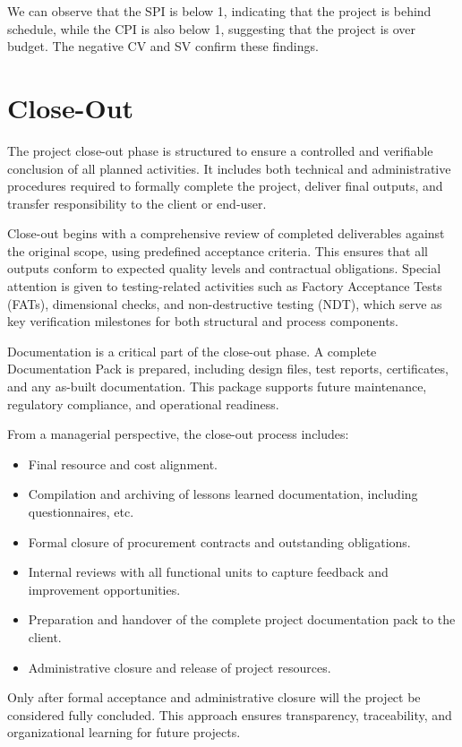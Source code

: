 We can observe that the SPI is below 1, indicating that the project is behind schedule, while the CPI is also below 1, suggesting that the project is over budget. The negative CV and SV confirm these findings.

\section{Close-Out}

The project close-out phase is structured to ensure a controlled and verifiable conclusion of all planned activities. It includes both technical and administrative procedures required to formally complete the project, deliver final outputs, and transfer responsibility to the client or end-user.

Close-out begins with a comprehensive review of completed deliverables against the original scope, using predefined acceptance criteria. This ensures that all outputs conform to expected quality levels and contractual obligations. Special attention is given to testing-related activities such as Factory Acceptance Tests (FATs), dimensional checks, and non-destructive testing (NDT), which serve as key verification milestones for both structural and process components.

Documentation is a critical part of the close-out phase. A complete Documentation Pack is prepared, including design files, test reports, certificates, and any as-built documentation. This package supports future maintenance, regulatory compliance, and operational readiness.

From a managerial perspective, the close-out process includes:
\begin{itemize}
    \item Final resource and cost alignment.
    \item Compilation and archiving of lessons learned documentation, including questionnaires, etc.
    \item Formal closure of procurement contracts and outstanding obligations.
    \item Internal reviews with all functional units to capture feedback and improvement opportunities.
    \item Preparation and handover of the complete project documentation pack to the client.
    \item Administrative closure and release of project resources.
\end{itemize}

Only after formal acceptance and administrative closure will the project be considered fully concluded. This approach ensures transparency, traceability, and organizational learning for future projects.

